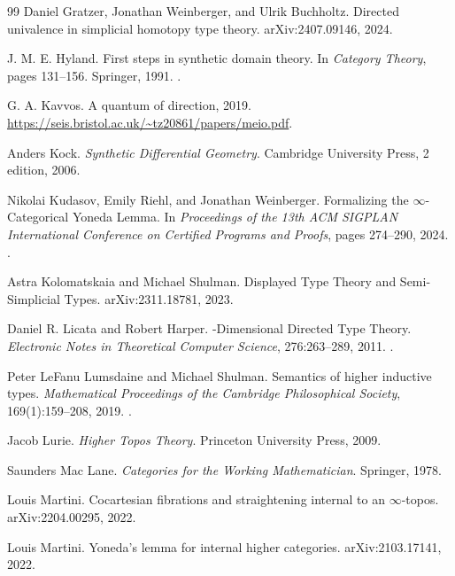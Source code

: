 \documentclass[12pt]{article}
\begin{document}
\begin{thebibliography}{99}
Daniel Gratzer, Jonathan Weinberger, and Ulrik Buchholtz.
\newblock Directed univalence in simplicial homotopy type theory.
\newblock arXiv:2407.09146, 2024.

J. M. E. Hyland.
\newblock First steps in synthetic domain theory.
\newblock In \emph{Category Theory}, pages 131--156. Springer, 1991.
\newblock {}.

G. A. Kavvos.
\newblock A quantum of direction, 2019.
\newblock \url{https://seis.bristol.ac.uk/~tz20861/papers/meio.pdf}.

Anders Kock.
\newblock \emph{Synthetic Differential Geometry}.
\newblock Cambridge University Press, 2 edition, 2006.

Nikolai Kudasov, Emily Riehl, and Jonathan Weinberger.
\newblock Formalizing the $\infty$-Categorical Yoneda Lemma.
\newblock In \emph{Proceedings of the 13th ACM SIGPLAN International Conference on Certified Programs and Proofs}, pages 274--290, 2024.
\newblock {}.

Astra Kolomatskaia and Michael Shulman.
\newblock Displayed Type Theory and Semi-Simplicial Types.
\newblock arXiv:2311.18781, 2023.

Daniel R. Licata and Robert Harper.
-Dimensional Directed Type Theory.
\newblock \emph{Electronic Notes in Theoretical Computer Science}, 276:263--289, 2011.
\newblock {}.

Peter LeFanu Lumsdaine and Michael Shulman.
\newblock Semantics of higher inductive types.
\newblock \emph{Mathematical Proceedings of the Cambridge Philosophical Society}, 169(1):159--208, 2019.
\newblock {}.

Jacob Lurie.
\newblock \emph{Higher Topos Theory}.
\newblock Princeton University Press, 2009.

Saunders Mac Lane.
\newblock \emph{Categories for the Working Mathematician}.
\newblock Springer, 1978.

Louis Martini.
\newblock Cocartesian fibrations and straightening internal to an $\infty$-topos.
\newblock arXiv:2204.00295, 2022.

Louis Martini.
\newblock Yoneda's lemma for internal higher categories.
\newblock arXiv:2103.17141, 2022.


\end{thebibliography}
\end{document}
